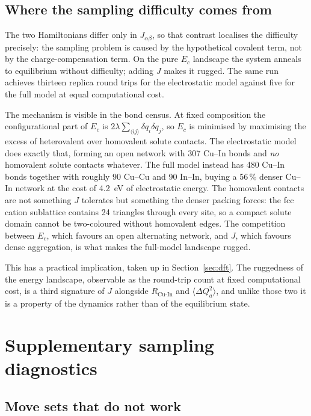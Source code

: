 \documentclass[11pt,a4paper]{article}
\newcommand{\dQ}{\Delta Q}
\newcommand{\RCuIn}{R_{\mathrm{Cu\text{-}In}}}
\begin{document}
\subsection{Where the sampling difficulty comes from}
\label{app:origin}

The two Hamiltonians differ only in $J_{\alpha\beta}$, so that contrast
localises the difficulty precisely: the sampling problem is caused by the
hypothetical covalent term, not by the charge-compensation term. On the pure
$E_c$ landscape the system anneals to equilibrium without difficulty; adding $J$
makes it rugged. The same run achieves thirteen replica round trips for the
electrostatic model against five for the full model at equal computational cost.

The mechanism is visible in the bond census. At fixed composition the
configurational part of $E_c$ is
$2\lambda \sum_{\langle ij\rangle} \delta q_i \delta q_j$, so $E_c$ is minimised
by maximising the excess of heterovalent over homovalent solute contacts. The
electrostatic model does exactly that, forming an open network with 307 Cu--In
bonds and \emph{no} homovalent solute contacts whatever. The full model instead
has 480 Cu--In bonds together with roughly 90 Cu--Cu and 90 In--In, buying a
56\,\% denser Cu--In network at the cost of 4.2~eV of electrostatic energy. The
homovalent contacts are not something $J$ tolerates but something the denser
packing forces: the fcc cation sublattice contains 24 triangles through every
site, so a compact solute domain cannot be two-coloured without homovalent
edges. The competition between $E_c$, which favours an open alternating network,
and $J$, which favours dense aggregation, is what makes the full-model landscape
rugged.

This has a practical implication, taken up in Section~\ref{sec:dft}. The ruggedness of
the energy landscape, observable as the round-trip count at fixed computational
cost, is a third signature of $J$ alongside $\RCuIn$ and
$\langle\dQ_a^2\rangle$, and unlike those two it is a property of the dynamics
rather than of the equilibrium state.

\section{Supplementary sampling diagnostics}
\label{app:sampling}

\subsection{Move sets that do not work}
\end{document}
